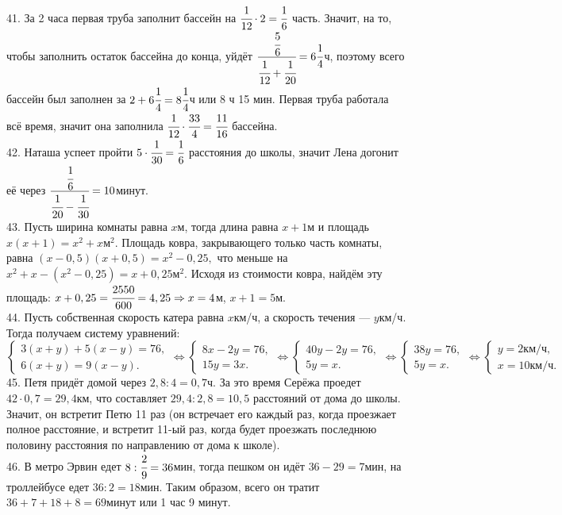 \documentclass[12pt]{article}
\begin{document}
41. За 2 часа первая труба заполнит бассейн на $\cfrac{1}{12}\cdot2=\cfrac{1}{6}$ часть. Значит, на то, чтобы заполнить остаток бассейна до конца, уйдёт $\cfrac{\cfrac{5}{6}}{\cfrac{1}{12}+\cfrac{1}{20}}=6\cfrac{1}{4}$ч, поэтому всего бассейн был заполнен за $2+6\cfrac{1}{4}=8\cfrac{1}{4}$ч или 8 ч 15 мин. Первая труба работала всё время, значит она заполнила $\cfrac{1}{12}\cdot\cfrac{33}{4}=\cfrac{11}{16}$ бассейна.\\
42. Наташа успеет пройти $5\cdot\cfrac{1}{30}=\cfrac{1}{6}$ расстояния до школы, значит Лена догонит её через $\cfrac{\cfrac{1}{6}}{\cfrac{1}{20}-\cfrac{1}{30}}=10$минут.\\
43. Пусть ширина комнаты равна $x$м, тогда длина равна $x+1$м и площадь $x(x+1)=x^2+x\text{м}^2.$ Площадь ковра, закрывающего только часть комнаты, равна $(x-0,5)(x+0,5)=x^2-0,25,$ что меньше на $x^2+x-(x^2-0,25)=x+0,25\text{м}^2.$ Исходя из стоимости ковра, найдём эту площадь: $x+0,25=\cfrac{2550}{600}=4,25\Rightarrow x=4$м, $x+1=5$м.\\
44. Пусть собственная скорость катера равна $x$км/ч, а скорость течения --- $y$км/ч. Тогда получаем систему уравнений: $\begin{cases}3(x+y)+5(x-y)=76,\\
6(x+y)=9(x-y).\end{cases}\Leftrightarrow\begin{cases}8x-2y=76,\\
15y=3x.\end{cases}\Leftrightarrow\begin{cases}40y-2y=76,\\
5y=x.\end{cases}\Leftrightarrow\begin{cases}38y=76,\\
5y=x.\end{cases}\Leftrightarrow\begin{cases} y=2\text{км/ч},\\
x=10\text{км/ч}.\end{cases}$\\
45. Петя придёт домой через $2,8:4=0,7$ч. За это время Серёжа проедет $42\cdot0,7=29,4$км, что составляет $29,4:2,8=10,5$ расстояний от дома до школы. Значит, он встретит Петю 11 раз (он встречает его каждый раз, когда проезжает полное расстояние, и встретит 11-ый раз, когда будет проезжать последнюю половину расстояния по направлению от дома к школе).\\
46. В метро Эрвин едет $8:\cfrac{2}{9}=36$мин, тогда пешком он идёт $36-29=7$мин, на троллейбусе едет $36:2=18$мин. Таким образом, всего он тратит $36+7+18+8=69$минут или 1 час 9 минут.\\
\end{document}
